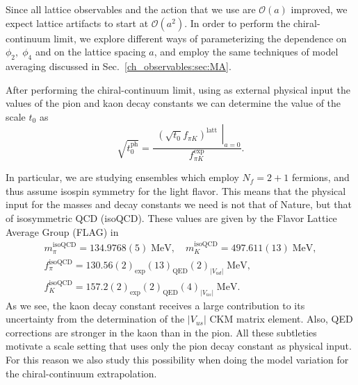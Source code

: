 Since all lattice observables and the action that we use are $\mathcal{O}(a)$ improved, we expect lattice artifacts to start at $\mathcal{O}(a^2)$. In order to perform the chiral-continuum limit, we explore different ways of parameterizing the dependence on $\phi_2,\;\phi_4$ and on the lattice spacing $a$, and employ the same techniques of model averaging discussed in Sec.~\ref{ch_observables:sec:MA}.

After performing the chiral-continuum limit, using as external physical input the values of the pion and kaon decay constants we can determine the value of the scale $t_0$ as
\begin{equation}
\sqrt{t_0^{\textrm{ph}}}=\frac{\left.\begin{matrix}
\left(\sqrt{t_0}f_{\pi K}\right)^{\textrm{latt}}
\end{matrix}\right|_{a=0}}{f_{\pi K}^{\textrm{exp}}}.
\end{equation}

In particular, we are studying ensembles which employ $N_f=2+1$ fermions, and thus assume isospin symmetry for the light flavor. This means that the physical input for the masses and decay constants we need is not that of Nature, but that of isosymmetric QCD (isoQCD). These values are given by the Flavor Lattice Average Group (FLAG) in~\cite{FLAG21}
\begin{gather}
\label{ch_ss:eq:isoQCD}
m_{\pi}^{\textrm{isoQCD}}=134.9768(5)\;{\textrm{MeV}}, \quad
m_{K}^{\textrm{isoQCD}}=497.611(13)\;{\textrm{MeV}}, \\
f_{\pi}^{\textrm{isoQCD}}=130.56(2)_{\textrm{exp}}(13)_{\textrm{QED}}(2)_{|V_{ud}|}\;{\textrm{MeV}}, \quad \\
f_{K}^{\textrm{isoQCD}}=157.2(2)_{\textrm{exp}}(2)_{\textrm{QED}}(4)_{|V_{us}|}\;{\textrm{MeV}}.
\end{gather} 
As we see, the kaon decay constant receives a large contribution to its uncertainty from the determination of the $|V_{us}|$ CKM matrix element. Also, QED corrections are stronger in the kaon than in the pion. All these subtleties motivate a scale setting that uses only the pion decay constant as physical input. For this reason we also study this possibility when doing the model variation for the chiral-continuum extrapolation.



